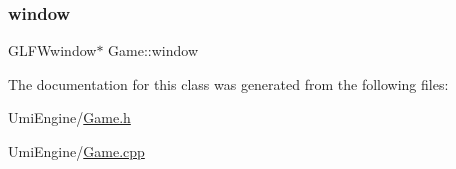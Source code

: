 \subsubsection{\texorpdfstring{window}{window}}
{\footnotesize\ttfamily G\+L\+F\+Wwindow$\ast$ Game\+::window\hspace{0.3cm}{\ttfamily [protected]}}



The documentation for this class was generated from the following files\+:\begin{DoxyCompactItemize}
\item 
Umi\+Engine/\mbox{\hyperlink{_game_8h}{Game.\+h}}\item 
Umi\+Engine/\mbox{\hyperlink{_game_8cpp}{Game.\+cpp}}\end{DoxyCompactItemize}

